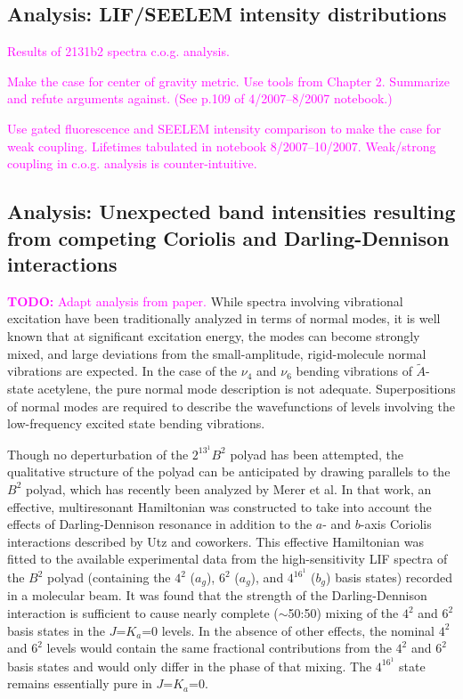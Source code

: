 \documentclass[12pt,draft]{mitthesis}
\newcommand{\TODO} [1]{\textcolor{magenta}{\textbf{TODO:} #1}}
\newcommand{\POINT}[1]{\textcolor{magenta}{#1}}
\begin{document}
\subsection{Analysis: LIF/SEELEM intensity distributions}

\POINT{Results of 2131b2 spectra c.o.g. analysis.}

\POINT{Make the case for center of gravity metric. Use tools from
  Chapter 2.  Summarize and refute arguments against.  (See p.109 of
  4/2007--8/2007 notebook.)}


\POINT{Use gated fluorescence and SEELEM intensity comparison to make
  the case for weak coupling. Lifetimes tabulated in notebook
  8/2007--10/2007.  Weak/strong coupling in c.o.g. analysis is
  counter-intuitive.}


\subsection{Analysis: Unexpected band intensities resulting from
  competing Coriolis and Darling-Dennison interactions}

\TODO{Adapt analysis from paper.}  While spectra involving vibrational
excitation have been traditionally analyzed in terms of normal modes,
it is well known that at significant excitation energy, the modes can
become strongly mixed, and large deviations from the small-amplitude,
rigid-molecule normal vibrations are expected.  In the case of the
$\nu_4$ and $\nu_6$ bending vibrations of $\tilde{A}$-state acetylene,
the pure normal mode description is not adequate. Superpositions of
normal modes are required to describe the wavefunctions of levels
involving the low-frequency excited state bending vibrations.

Though no deperturbation of the $2^13^1B^2$ polyad has been attempted,
the qualitative structure of the polyad can be anticipated by drawing
parallels to the $B^2$ polyad, which has recently been analyzed by
Merer et al.  In that work, an effective, multiresonant Hamiltonian
was constructed to take into account the effects of Darling-Dennison
resonance in addition to the $a$- and $b$-axis Coriolis interactions
described by Utz and coworkers.  This effective Hamiltonian was fitted
to the available experimental data from the high-sensitivity LIF
spectra of the $B^2$ polyad (containing the $4^2$ ($a_g$), $6^2$
($a_g$), and $4^16^1$ ($b_g$) basis states) recorded in a molecular
beam. It was found that the strength of the Darling-Dennison
interaction is sufficient to cause nearly complete ($\sim$50:50)
mixing of the $4^2$ and $6^2$ basis states in the $J$=$K_a$=0
levels. In the absence of other effects, the nominal $4^2$ and $6^2$
levels would contain the same fractional contributions from the $4^2$
and $6^2$ basis states and would only differ in the phase of that
mixing.  The $4^16^1$ state remains essentially pure in $J$=$K_a$=0.
\end{document}
